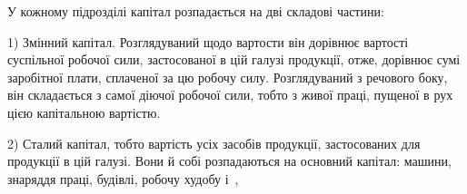 У кожному підрозділі капітал розпадається на дві складові частини:

1) Змінний капітал. Розглядуваний щодо вартости він дорівнює
вартості суспільної робочої сили, застосованої в цій галузі продукції,
отже, дорівнює сумі заробітної плати, сплаченої за цю робочу силу.
Розглядуваний з речового боку, він складається з самої діючої робочої
сили, тобто з живої праці, пущеної в рух цією капітальною вартістю.

2) Сталий капітал, тобто вартість усіх засобів продукції, застосованих
для продукції в цій галузі. Вони й собі розпадаються на основний
капітал: машини, знаряддя праці, будівлі, робочу худобу і~,
\parbreak{}  %
